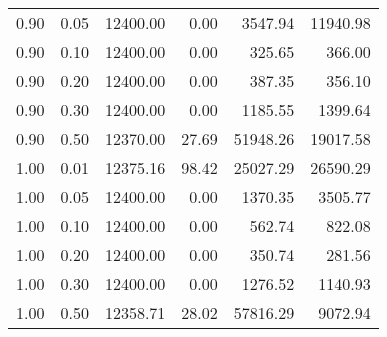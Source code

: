 \begin{table}
\begin{tabular}{rrrrrr}
0.90 & 0.05 & 12400.00 & 0.00 & 3547.94 & 11940.98 \\
0.90 & 0.10 & 12400.00 & 0.00 & 325.65 & 366.00 \\
0.90 & 0.20 & 12400.00 & 0.00 & 387.35 & 356.10 \\
0.90 & 0.30 & 12400.00 & 0.00 & 1185.55 & 1399.64 \\
0.90 & 0.50 & 12370.00 & 27.69 & 51948.26 & 19017.58 \\
1.00 & 0.01 & 12375.16 & 98.42 & 25027.29 & 26590.29 \\
1.00 & 0.05 & 12400.00 & 0.00 & 1370.35 & 3505.77 \\
1.00 & 0.10 & 12400.00 & 0.00 & 562.74 & 822.08 \\
1.00 & 0.20 & 12400.00 & 0.00 & 350.74 & 281.56 \\
1.00 & 0.30 & 12400.00 & 0.00 & 1276.52 & 1140.93 \\
1.00 & 0.50 & 12358.71 & 28.02 & 57816.29 & 9072.94 \\
\bottomrule
\end{tabular}
\end{table}
